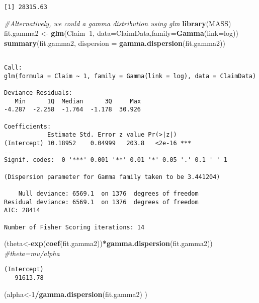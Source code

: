 \documentclass[]{book}
\newenvironment{Shaded}{\begin{snugshade}}{\end{snugshade}}
\newcommand{\KeywordTok}[1]{\textcolor[rgb]{0.13,0.29,0.53}{\textbf{#1}}}
\newcommand{\DataTypeTok}[1]{\textcolor[rgb]{0.13,0.29,0.53}{#1}}
\newcommand{\DecValTok}[1]{\textcolor[rgb]{0.00,0.00,0.81}{#1}}
\newcommand{\StringTok}[1]{\textcolor[rgb]{0.31,0.60,0.02}{#1}}
\newcommand{\CommentTok}[1]{\textcolor[rgb]{0.56,0.35,0.01}{\textit{#1}}}
\newcommand{\OperatorTok}[1]{\textcolor[rgb]{0.81,0.36,0.00}{\textbf{#1}}}
\newcommand{\NormalTok}[1]{#1}
\theoremstyle{definition}
\theoremstyle{definition}
\theoremstyle{definition}
\theoremstyle{remark}
\begin{document}
\begin{verbatim}
[1] 28315.63
\end{verbatim}

\begin{Shaded}
\begin{Highlighting}[]
\CommentTok{#Alternatively, we could a gamma distribution using glm}
\KeywordTok{library}\NormalTok{(MASS)}
\NormalTok{fit.gamma2 <-}\StringTok{ }\KeywordTok{glm}\NormalTok{(Claim}\OperatorTok{~}\DecValTok{1}\NormalTok{, }\DataTypeTok{data=}\NormalTok{ClaimData,}\DataTypeTok{family=}\KeywordTok{Gamma}\NormalTok{(}\DataTypeTok{link=}\NormalTok{log)) }
\KeywordTok{summary}\NormalTok{(fit.gamma2, }\DataTypeTok{dispersion =} \KeywordTok{gamma.dispersion}\NormalTok{(fit.gamma2)) }
\end{Highlighting}
\end{Shaded}

\begin{verbatim}

Call:
glm(formula = Claim ~ 1, family = Gamma(link = log), data = ClaimData)

Deviance Residuals: 
   Min      1Q  Median      3Q     Max  
-4.287  -2.258  -1.764  -1.178  30.926  

Coefficients:
            Estimate Std. Error z value Pr(>|z|)    
(Intercept) 10.18952    0.04999   203.8   <2e-16 ***
---
Signif. codes:  0 '***' 0.001 '**' 0.01 '*' 0.05 '.' 0.1 ' ' 1

(Dispersion parameter for Gamma family taken to be 3.441204)

    Null deviance: 6569.1  on 1376  degrees of freedom
Residual deviance: 6569.1  on 1376  degrees of freedom
AIC: 28414

Number of Fisher Scoring iterations: 14
\end{verbatim}

\begin{Shaded}
\begin{Highlighting}[]
\NormalTok{(theta<-}\KeywordTok{exp}\NormalTok{(}\KeywordTok{coef}\NormalTok{(fit.gamma2))}\OperatorTok{*}\KeywordTok{gamma.dispersion}\NormalTok{(fit.gamma2)) }\CommentTok{#theta=mu/alpha}
\end{Highlighting}
\end{Shaded}

\begin{verbatim}
(Intercept) 
   91613.78 
\end{verbatim}

\begin{Shaded}
\begin{Highlighting}[]
\NormalTok{(alpha<-}\DecValTok{1}\OperatorTok{/}\KeywordTok{gamma.dispersion}\NormalTok{(fit.gamma2) )}
\end{Highlighting}
\end{Shaded}
\end{document}
